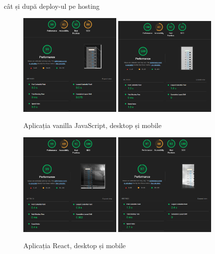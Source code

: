 \documentclass[12pt, a4paper]{report}
\begin{document}
cât și după deploy-ul pe hosting

\begin{figure}[htbp]
	\centering
	\includegraphics[width=0.45\textwidth]{01_desktop_deployed_lighthouse.png}
	\includegraphics[width=0.45\textwidth]{01_mobile_deployed_lighthouse.png}
	\caption{Aplicația vanilla JavaScript, desktop și mobile}
	\label{fig:01-deployed-lighthouse}
\end{figure}

\begin{figure}[htbp]
	\centering
	\includegraphics[width=0.45\textwidth]{02_desktop_deployed_lighthouse.png}
	\includegraphics[width=0.45\textwidth]{02_mobile_deployed_lighthouse.png}
	\caption{Aplicația React, desktop și mobile}
	\label{fig:02-deployed-lighthouse}
\end{figure}
\end{document}
